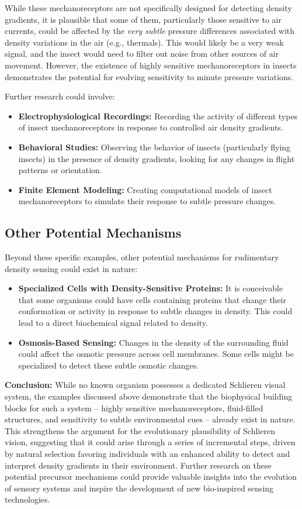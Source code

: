 \documentclass[11pt]{article}
\begin{document}
While these mechanoreceptors are not specifically designed for detecting density gradients, it is plausible that some of them, particularly those sensitive to air currents, could be affected by the \textit{very subtle} pressure differences associated with density variations in the air (e.g., thermals). This would likely be a very weak signal, and the insect would need to filter out noise from other sources of air movement. However, the existence of highly sensitive mechanoreceptors in insects demonstrates the potential for evolving sensitivity to minute pressure variations.

Further research could involve:
\begin{itemize}
    \item \textbf{Electrophysiological Recordings:} Recording the activity of different types of insect mechanoreceptors in response to controlled air density gradients.
    \item \textbf{Behavioral Studies:} Observing the behavior of insects (particularly flying insects) in the presence of density gradients, looking for any changes in flight patterns or orientation.
    \item \textbf{Finite Element Modeling:} Creating computational models of insect mechanoreceptors to simulate their response to subtle pressure changes.
\end{itemize}

\subsection{Other Potential Mechanisms}

Beyond these specific examples, other potential mechanisms for rudimentary density sensing could exist in nature:
\begin{itemize}
    \item \textbf{Specialized Cells with Density-Sensitive Proteins:} It is conceivable that some organisms could have cells containing proteins that change their conformation or activity in response to subtle changes in density. This could lead to a direct biochemical signal related to density.
    \item \textbf{Osmosis-Based Sensing:} Changes in the density of the surrounding fluid could affect the osmotic pressure across cell membranes. Some cells might be specialized to detect these subtle osmotic changes.
\end{itemize}

\noindent\textbf{Conclusion:}
While no known organism possesses a dedicated Schlieren visual system, the examples discussed above demonstrate that the biophysical building blocks for such a system – highly sensitive mechanoreceptors, fluid-filled structures, and sensitivity to subtle environmental cues – already exist in nature. This strengthens the argument for the evolutionary plausibility of Schlieren vision, suggesting that it could arise through a series of incremental steps, driven by natural selection favoring individuals with an enhanced ability to detect and interpret density gradients in their environment. Further research on these potential precursor mechanisms could provide valuable insights into the evolution of sensory systems and inspire the development of new bio-inspired sensing technologies.
\end{document}
